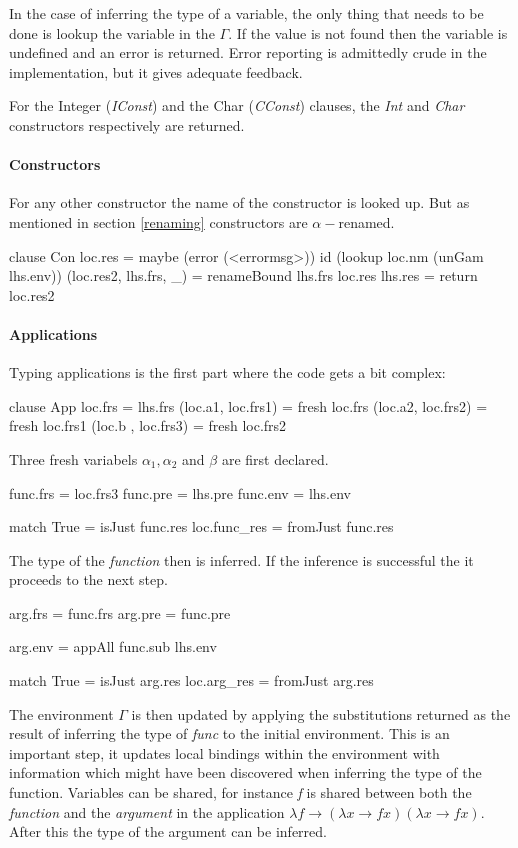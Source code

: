 In the case of inferring the type of a variable, the only thing that needs to be done is lookup the variable in the $\Gamma$. If the value is not found then the variable is undefined and an error is returned. Error reporting is admittedly crude in the implementation, but it gives adequate feedback.

For the Integer (\emph{IConst}) and the Char (\emph{CConst}) clauses, the \emph{Int} and \emph{Char} constructors respectively are returned.

\paragraph{Constructors}
For any other constructor the name of the constructor is looked up. But as mentioned in section \ref{renaming} constructors are $\alpha-$renamed.

\begin{code}
clause Con
   loc.res = maybe (error (<errormsg>)) id (lookup loc.nm (unGam lhs.env))
   (loc.res2, lhs.frs, _) = renameBound lhs.frs loc.res
   lhs.res = return loc.res2
\end{code}

\paragraph{Applications}
Typing applications is the first part where the code gets a bit complex:

\begin{code}
clause App
   loc.frs            = lhs.frs
   (loc.a1, loc.frs1) = fresh loc.frs
   (loc.a2, loc.frs2) = fresh loc.frs1
   (loc.b , loc.frs3) = fresh loc.frs2
\end{code}
Three fresh variabels $\alpha_1, \alpha_2$ and $\beta$ are first declared.

\begin{code}
func.frs = loc.frs3
func.pre = lhs.pre
func.env = lhs.env
    
match True   = isJust func.res       
loc.func_res = fromJust func.res
\end{code}
The type of the \emph{function} then is inferred. If the inference is successful the it proceeds to the next step.

\begin{code}       
arg.frs = func.frs
arg.pre = func.pre
    
arg.env = appAll func.sub lhs.env
 
match True = isJust arg.res   
loc.arg_res = fromJust arg.res
\end{code}
The environment $\Gamma$ is then updated by applying the substitutions returned as the result of inferring the type of \emph{func} to the initial environment. This is an important step, it updates local bindings within the environment with information which might have been discovered when inferring the type of the function. Variables can be shared, for instance \emph{f} is shared between both the \emph{function} and the \emph{argument} in the application $\lambda f \rightarrow (\lambda x \rightarrow f x) (\lambda x \rightarrow f x)$. After this the type of the argument can be inferred.
       
